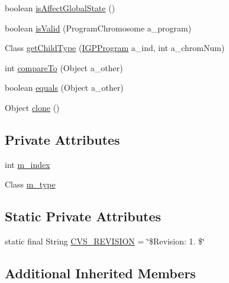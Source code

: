 \begin{DoxyCompactItemize}
\item 
boolean \hyperlink{classorg_1_1jgap_1_1gp_1_1function_1_1_store_terminal_indexed_a112627907e52a79e78a0d9dcd16b2707}{is\-Affect\-Global\-State} ()
\item 
boolean \hyperlink{classorg_1_1jgap_1_1gp_1_1function_1_1_store_terminal_indexed_ae7c8d4ee251142235aa3541a6e3b1453}{is\-Valid} (Program\-Chromosome a\-\_\-program)
\item 
Class \hyperlink{classorg_1_1jgap_1_1gp_1_1function_1_1_store_terminal_indexed_af79c16828ac9cd5eb5298b4e4dc791ac}{get\-Child\-Type} (\hyperlink{interfaceorg_1_1jgap_1_1gp_1_1_i_g_p_program}{I\-G\-P\-Program} a\-\_\-ind, int a\-\_\-chrom\-Num)
\item 
int \hyperlink{classorg_1_1jgap_1_1gp_1_1function_1_1_store_terminal_indexed_aeb1c1641404eb7cd4d059f36fd1c4525}{compare\-To} (Object a\-\_\-other)
\item 
boolean \hyperlink{classorg_1_1jgap_1_1gp_1_1function_1_1_store_terminal_indexed_acf8f9a4033f510e2506f7f8fdfa1a039}{equals} (Object a\-\_\-other)
\item 
Object \hyperlink{classorg_1_1jgap_1_1gp_1_1function_1_1_store_terminal_indexed_a84b60575e749df119c2571905df8d867}{clone} ()
\end{DoxyCompactItemize}
\subsection*{Private Attributes}
\begin{DoxyCompactItemize}
\item 
int \hyperlink{classorg_1_1jgap_1_1gp_1_1function_1_1_store_terminal_indexed_adf35898830f412d30643af3a4bd5d5b0}{m\-\_\-index}
\item 
Class \hyperlink{classorg_1_1jgap_1_1gp_1_1function_1_1_store_terminal_indexed_a3f956f933adda02689aead6ccbc2e0d3}{m\-\_\-type}
\end{DoxyCompactItemize}
\subsection*{Static Private Attributes}
\begin{DoxyCompactItemize}
\item 
static final String \hyperlink{classorg_1_1jgap_1_1gp_1_1function_1_1_store_terminal_indexed_a7baf873c183a7475871802fbb2e8c502}{C\-V\-S\-\_\-\-R\-E\-V\-I\-S\-I\-O\-N} = \char`\"{}\$Revision\-: 1. \$\char`\"{}
\end{DoxyCompactItemize}
\subsection*{Additional Inherited Members}


